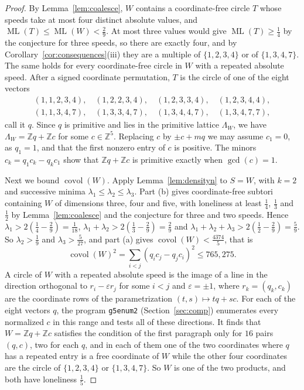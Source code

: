 \documentclass[12pt]{amsart}
\theoremstyle{definition}\newtheorem{definition}[theorem]{Definition}
\theoremstyle{remark}\newtheorem{remark}[theorem]{Remark}
\newcommand{\Z}{\mathbb Z}\newcommand{\R}{\mathbb R}\newcommand{\T}{\mathbb T}
\newcommand{\ML}{\operatorname{ML}}
\newcommand{\covol}{\operatorname{covol}}
\begin{document}
\begin{proof}
By Lemma~\ref{lem:coalesce}, $W$ contains a coordinate-free circle $T$ whose speeds take at most four distinct absolute values, and $\ML(T)\le\ML(W)<\frac29$. At most three values would give $\ML(T)\ge\frac14$ by the conjecture for three speeds, so there are exactly four, and by Corollary~\ref{cor:consequences}(iii) they are a multiple of $\{1,2,3,4\}$ or of $\{1,3,4,7\}$. The same holds for every coordinate-free circle in $W$ with a repeated absolute speed. After a signed coordinate permutation, $T$ is the circle of one of the eight vectors
\begin{gather*}
 (1,1,2,3,4),\quad(1,2,2,3,4),\quad(1,2,3,3,4),\quad(1,2,3,4,4),\\
 (1,1,3,4,7),\quad(1,3,3,4,7),\quad(1,3,4,4,7),\quad(1,3,4,7,7),
\end{gather*}
call it $q$.
Since $q$ is primitive and lies in the primitive lattice $\Lambda_W$, we have $\Lambda_W=\Z q+\Z c$ for some $c\in\Z^5$. Replacing $c$ by $\pm c+mq$ we may assume $c_1=0$, as $q_1=1$, and that the first nonzero entry of $c$ is positive. The minors $c_k=q_1c_k-q_kc_1$ show that $\Z q+\Z c$ is primitive exactly when $\gcd(c)=1$.

Next we bound $\covol(W)$. Apply Lemma~\ref{lem:densityn} to $S=W$, with $k=2$ and successive minima $\lambda_1\le\lambda_2\le\lambda_3$. Part (b) gives coordinate-free subtori containing $W$ of dimensions three, four and five, with loneliness at least $\frac14$, $\frac13$ and $\frac12$ by Lemma~\ref{lem:coalesce} and the conjecture for three and two speeds. Hence $\lambda_1>2(\frac14-\frac29)=\frac1{18}$, $\lambda_1+\lambda_2>2(\frac13-\frac29)=\frac29$ and $\lambda_1+\lambda_2+\lambda_3>2(\frac12-\frac29)=\frac59$. So $\lambda_2>\frac19$ and $\lambda_3>\frac5{27}$, and part (a) gives $\covol(W)<\frac{4374}5$, that is
\[
 \covol(W)^2=\sum_{i<j}(q_ic_j-q_jc_i)^2\le 765{,}275 .
\]
A circle of $W$ with a repeated absolute speed is the image of a line in the direction orthogonal to $r_i-\varepsilon r_j$ for some $i<j$ and $\varepsilon=\pm1$, where $r_k=(q_k,c_k)$ are the coordinate rows of the parametrization $(t,s)\mapsto tq+sc$. For each of the eight vectors $q$, the program \texttt{g5enum2} (Section~\ref{sec:comp}) enumerates every normalized $c$ in this range and tests all of these directions. It finds that $W=\Z q+\Z c$ satisfies the condition of the first paragraph only for $16$ pairs $(q,c)$, two for each $q$, and in each of them one of the two coordinates where $q$ has a repeated entry is a free coordinate of $W$ while the other four coordinates are the circle of $\{1,2,3,4\}$ or $\{1,3,4,7\}$. So $W$ is one of the two products, and both have loneliness $\frac15$.
\end{proof}
\end{document}
